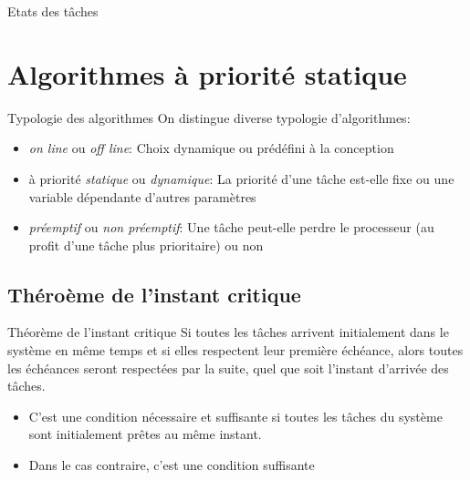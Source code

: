 \begin{frame}{Etats des tâches}
  \begin{center}
    
  \end{center}
\end{frame} 


\section{Algorithmes à priorité statique}

\begin{frame}{Typologie des algorithmes}
  On distingue diverse typologie d'algorithmes:
  \begin{itemize}
  \item  \emph{on  line}  ou   \emph{off  line}:  Choix  dynamique  ou
    prédéfini à la conception
  \item  à priorité \emph{statique}  ou \emph{dynamique}:  La priorité
    d'une  tâche est-elle  fixe  ou une  variable dépendante  d'autres
    paramètres 
  \item \emph{préemptif} ou  \emph{non préemptif}: Une tâche peut-elle
    perdre le  processeur (au profit d'une tâche  plus prioritaire) ou
    non
  \end{itemize}
\end{frame}

\subsection{Théroème de l'instant critique}

\begin{frame}{Théorème de l'instant critique}
  Si toutes les  tâches arrivent initialement dans le  système en même
  temps et  si elles respectent  leur première échéance,  alors toutes
  les  échéances  seront  respectées  par  la  suite,  quel  que  soit
  l'instant d'arrivée des tâches.

  \begin{itemize}
  \item  C'est une condition  nécessaire et  suffisante si  toutes les
    tâches du système sont initialement prêtes au même instant.
  \item Dans le cas contraire, c'est une condition suffisante
  \end{itemize}

\end{frame}

